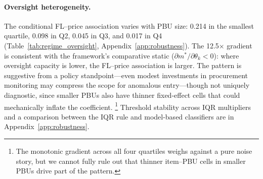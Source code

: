 \paragraph{Oversight heterogeneity.}
The conditional FL--price association varies with PBU size: 0.214 in
the smallest quartile, 0.098 in Q2, 0.045 in Q3, and 0.017 in Q4
(Table~\ref{tab:regime_oversight}, Appendix~\ref{app:robustness}).
The 12.5$\times$ gradient is consistent with the framework's
comparative static ($\partial m^*/\partial \theta_k < 0$): where
oversight capacity is lower, the FL--price association is larger.
The pattern is suggestive from a policy standpoint---even modest
investments in procurement monitoring may compress the scope for
anomalous entry---though not uniquely diagnostic, since smaller PBUs
also have thinner fixed-effect cells that could mechanically inflate
the coefficient.%
\footnote{The monotonic gradient across all four quartiles weighs
against a pure noise story, but we cannot fully rule out that thinner
item--PBU cells in smaller PBUs drive part of the pattern.}
Threshold stability across IQR multipliers and a comparison between
the IQR rule and model-based classifiers are in
Appendix~\ref{app:robustness}.
